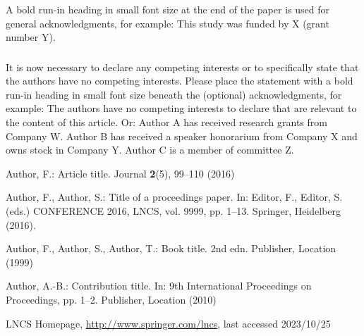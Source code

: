 \documentclass[runningheads]{llncs}
\begin{document}
\begin{credits}
\subsubsection{\ackname} A bold run-in heading in small font size at the end of the paper is
used for general acknowledgments, for example: This study was funded
by X (grant number Y).

\subsubsection{\discintname}
It is now necessary to declare any competing interests or to specifically
state that the authors have no competing interests. Please place the
statement with a bold run-in heading in small font size beneath the
(optional) acknowledgments,
for example: The authors have no competing interests to declare that are
relevant to the content of this article. Or: Author A has received research
grants from Company W. Author B has received a speaker honorarium from
Company X and owns stock in Company Y. Author C is a member of committee Z.
\end{credits}
%
%
%
% 
% 
%
\begin{thebibliography}{8}
Author, F.: Article title. Journal \textbf{2}(5), 99--110 (2016)

Author, F., Author, S.: Title of a proceedings paper. In: Editor,
F., Editor, S. (eds.) CONFERENCE 2016, LNCS, vol. 9999, pp. 1--13.
Springer, Heidelberg (2016). 

Author, F., Author, S., Author, T.: Book title. 2nd edn. Publisher,
Location (1999)

Author, A.-B.: Contribution title. In: 9th International Proceedings
on Proceedings, pp. 1--2. Publisher, Location (2010)

LNCS Homepage, \url{http://www.springer.com/lncs}, last accessed 2023/10/25
\end{thebibliography}
\end{document}
